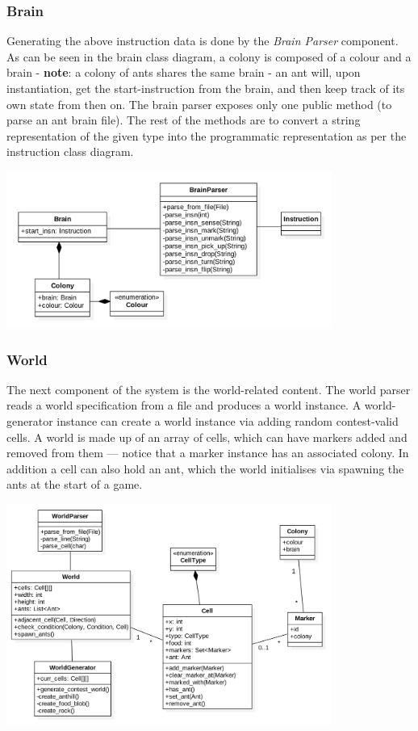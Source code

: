 \documentclass[11pt]{article}
\begin{document}
\subsubsection{Brain}

Generating the above instruction data is done by the \textit{Brain Parser} component. As can be seen in the brain class diagram, a colony is composed of a colour and a brain - \textbf{note}: a colony of ants shares the same brain - an ant will, upon instantiation, get the start-instruction from the brain, and then keep track of its own state from then on. The brain parser exposes only one public method (to parse an ant brain file). The rest of the methods are to convert a string representation of the given type into the programmatic representation as per the instruction class diagram.

\begin{center}
\includegraphics[width=0.8\textwidth]{low-level-diagrams/class/brain.png}
\end{center}

\subsubsection{World}

The next component of the system is the world-related content. The world parser reads a world specification from a file and produces a world instance. A world-generator instance can create a world instance via adding random contest-valid cells. A world is made up of an array of cells, which can have markers added and removed from them --- notice that a marker instance has an associated colony. In addition a cell can also hold an ant, which the world initialises via spawning the ants at the start of a game. 

\begin{center}
\includegraphics[width=0.8\textwidth]{low-level-diagrams/class/world.png}
\end{center}
\end{document}
